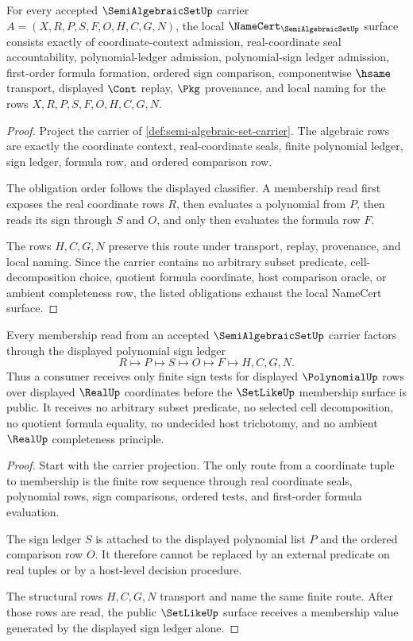 \begin{theorem}
\label{thm:semi-algebraic-set-namecert-obligations}
For every accepted $\SemiAlgebraicSetUp$ carrier $A=(X,R,P,S,F,O,H,C,G,N)$, the local $\NameCert_{\SemiAlgebraicSetUp}$ surface consists exactly of coordinate-context admission, real-coordinate seal accountability, polynomial-ledger admission, polynomial-sign ledger admission, first-order formula formation, ordered sign comparison, componentwise $\hsame$ transport, displayed $\Cont$ replay, $\Pkg$ provenance, and local naming for the rows $X,R,P,S,F,O,H,C,G,N$.
\end{theorem}
\begin{proof}
Project the carrier of \autoref{def:semi-algebraic-set-carrier}. The algebraic rows are exactly the coordinate context, real-coordinate seals, finite polynomial ledger, sign ledger, formula row, and ordered comparison row.

The obligation order follows the displayed classifier. A membership read first exposes the real coordinate rows $R$, then evaluates a polynomial from $P$, then reads its sign through $S$ and $O$, and only then evaluates the formula row $F$.

The rows $H,C,G,N$ preserve this route under transport, replay, provenance, and local naming. Since the carrier contains no arbitrary subset predicate, cell-decomposition choice, quotient formula coordinate, host comparison oracle, or ambient completeness row, the listed obligations exhaust the local NameCert surface.
\end{proof}

\begin{theorem}
\label{thm:semi-algebraic-set-polynomial-sign-ledger}
Every membership read from an accepted $\SemiAlgebraicSetUp$ carrier factors through the displayed polynomial sign ledger
$$
R\longmapsto P\longmapsto S\longmapsto O\longmapsto F\longmapsto H,C,G,N .
$$
Thus a consumer receives only finite sign tests for displayed $\PolynomialUp$ rows over displayed $\RealUp$ coordinates before the $\SetLikeUp$ membership surface is public. It receives no arbitrary subset predicate, no selected cell decomposition, no quotient formula equality, no undecided host trichotomy, and no ambient $\RealUp$ completeness principle.
\end{theorem}
\begin{proof}
Start with the carrier projection. The only route from a coordinate tuple to membership is the finite row sequence through real coordinate seals, polynomial rows, sign comparisons, ordered tests, and first-order formula evaluation.

The sign ledger $S$ is attached to the displayed polynomial list $P$ and the ordered comparison row $O$. It therefore cannot be replaced by an external predicate on real tuples or by a host-level decision procedure.

The structural rows $H,C,G,N$ transport and name the same finite route. After those rows are read, the public $\SetLikeUp$ surface receives a membership value generated by the displayed sign ledger alone.
\end{proof}


